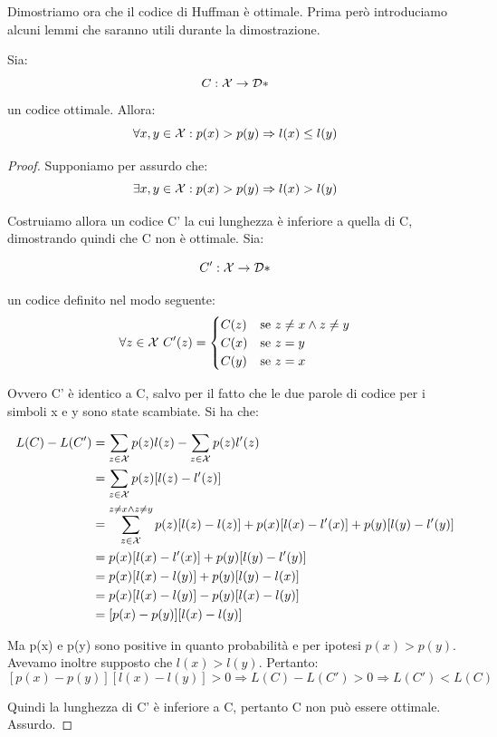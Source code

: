 Dimostriamo ora che il codice di Huffman è ottimale. Prima però introduciamo alcuni lemmi che saranno utili durante la dimostrazione.
\begin{proposizione}
\mbox{}

 Sia:
 \[
  C: \mathcal{X} \to \mathcal{D}*
 \]
  un codice ottimale. Allora:
\[
 \forall x,y \in \mathcal{X}: p(x)>p(y) \Rightarrow l(x) \le l(y)
\]
\begin{proof}
\mbox{}

 Supponiamo per assurdo che:
\[
 \exists x,y \in \mathcal{X}: p(x)>p(y) \Rightarrow l(x) > l(y)
\]

 \noindent
 Costruiamo allora un codice C' la cui lunghezza è inferiore a quella di C, dimostrando quindi che C 
 non è ottimale. Sia:

 \[
  C': \mathcal{X} \to \mathcal{D}*
 \]

 un codice definito nel modo seguente:
 \[
  \forall z \in \mathcal{X} \
  C'(z)=
   \begin{cases} 
     C(z) & \mbox{se } z \ne x \land z \ne y  \\ 
     C(x) & \mbox{se } z=y \\
     C(y) & \mbox{se } z=x
   \end{cases} 
 \]

\noindent
Ovvero C' è identico a C, salvo per il fatto che le due parole di codice per i simboli x e y sono state scambiate.
Si ha che:

\[ \begin{split}
 L(C)-L(C') &=\sum_{z \in \mathcal{X}} p(z) l(z) - \sum_{z \in \mathcal{X}} p(z) l'(z) \\
            &=\sum_{z \in \mathcal{X}} p(z)[l(z)-l'(z)] \\
            &=\sum_{z \in \mathcal{X}}^{
                    z \ne x \land z\ne y} p(z)[l(z)-l(z)] + p(x)[l(x)-l'(x)] + p(y)[l(y)-l'(y)] \\
            &=p(x)[l(x)-l'(x)] + p(y)[l(y)-l'(y)] \\
            &=p(x)[l(x)-l(y)] + p(y)[l(y)-l(x)] \\
            &=p(x)[l(x)-l(y)] - p(y)[l(x)-l(y)] \\
            &=[p(x)-p(y)][l(x)-l(y)]
   \end{split}
\]

\noindent
Ma p(x) e p(y) sono positive in quanto probabilità e per ipotesi $p(x) > p(y)$. Avevamo inoltre supposto che $l(x) > l(y)$. Pertanto:
\[
 [p(x)-p(y)][l(x)-l(y)] > 0 \Rightarrow L(C)-L(C')>0 \Rightarrow L(C')<L(C)
\]

\noindent
Quindi la lunghezza di C' è inferiore a C, pertanto C non può essere ottimale. Assurdo.

\end{proof}

\end{proposizione}

